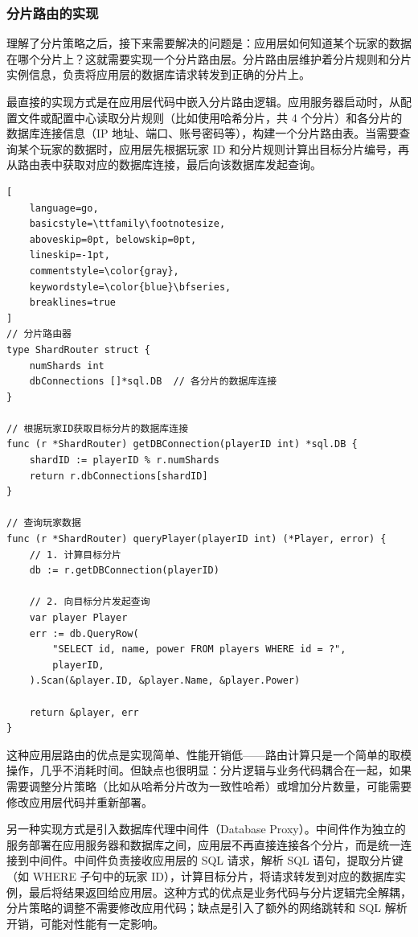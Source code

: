 \subsubsection{分片路由的实现}

理解了分片策略之后，接下来需要解决的问题是：应用层如何知道某个玩家的数据在哪个分片上？这就需要实现一个分片路由层。分片路由层维护着分片规则和分片实例信息，负责将应用层的数据库请求转发到正确的分片上。

最直接的实现方式是在应用层代码中嵌入分片路由逻辑。应用服务器启动时，从配置文件或配置中心读取分片规则（比如使用哈希分片，共 4 个分片）和各分片的数据库连接信息（IP 地址、端口、账号密码等），构建一个分片路由表。当需要查询某个玩家的数据时，应用层先根据玩家 ID 和分片规则计算出目标分片编号，再从路由表中获取对应的数据库连接，最后向该数据库发起查询。

\begin{tcolorbox}[title=应用层分片路由的实现示例]
\begin{lstlisting}[
    language=go,
    basicstyle=\ttfamily\footnotesize,
    aboveskip=0pt, belowskip=0pt,
    lineskip=-1pt,
    commentstyle=\color{gray},
    keywordstyle=\color{blue}\bfseries,
    breaklines=true
]
// 分片路由器
type ShardRouter struct {
    numShards int
    dbConnections []*sql.DB  // 各分片的数据库连接
}

// 根据玩家ID获取目标分片的数据库连接
func (r *ShardRouter) getDBConnection(playerID int) *sql.DB {
    shardID := playerID % r.numShards
    return r.dbConnections[shardID]
}

// 查询玩家数据
func (r *ShardRouter) queryPlayer(playerID int) (*Player, error) {
    // 1. 计算目标分片
    db := r.getDBConnection(playerID)
    
    // 2. 向目标分片发起查询
    var player Player
    err := db.QueryRow(
        "SELECT id, name, power FROM players WHERE id = ?",
        playerID,
    ).Scan(&player.ID, &player.Name, &player.Power)
    
    return &player, err
}
\end{lstlisting}
\end{tcolorbox}

这种应用层路由的优点是实现简单、性能开销低——路由计算只是一个简单的取模操作，几乎不消耗时间。但缺点也很明显：分片逻辑与业务代码耦合在一起，如果需要调整分片策略（比如从哈希分片改为一致性哈希）或增加分片数量，可能需要修改应用层代码并重新部署。

另一种实现方式是引入数据库代理中间件（Database Proxy）。中间件作为独立的服务部署在应用服务器和数据库之间，应用层不再直接连接各个分片，而是统一连接到中间件。中间件负责接收应用层的 SQL 请求，解析 SQL 语句，提取分片键（如 WHERE 子句中的玩家 ID），计算目标分片，将请求转发到对应的数据库实例，最后将结果返回给应用层。这种方式的优点是业务代码与分片逻辑完全解耦，分片策略的调整不需要修改应用代码；缺点是引入了额外的网络跳转和 SQL 解析开销，可能对性能有一定影响。

